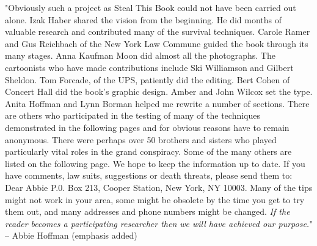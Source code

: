 "Obviously such a project as Steal This Book could not have been carried
out alone. Izak Haber shared the vision from the beginning. He did
months of valuable research and contributed many of the survival
techniques. Carole Ramer and Gus Reichbach of the New York Law Commune
guided the book through its many stages. Anna Kaufman Moon did almost
all the photographs. The cartoonists who have made contributions include
Ski Williamson and Gilbert Sheldon. Tom Forcade, of the UPS, patiently
did the editing. Bert Cohen of Concert Hall did the book's graphic
design. Amber and John Wilcox set the type. Anita Hoffman and Lynn
Borman helped me rewrite a number of sections. There are others who
participated in the testing of many of the techniques demonstrated in
the following pages and for obvious reasons have to remain anonymous.
There were perhaps over 50 brothers and sisters who played particularly
vital roles in the grand conspiracy. Some of the many others are listed
on the following page. We hope to keep the information up to date. If
you have comments, law suits, suggestions or death threats, please send
them to: Dear Abbie P.0. Box 213, Cooper Station, New York, NY 10003.
Many of the tips might not work in your area, some might be obsolete by
the time you get to try them out, and many addresses and phone numbers
might be changed. \emph{If the reader becomes a participating researcher
then we will have achieved our purpose.}" -- Abbie Hoffman (emphasis
added)
